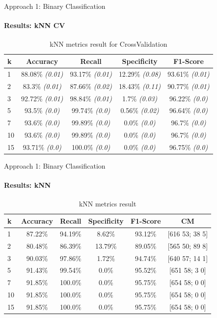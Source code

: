 \documentclass[9pt, pstricks, xcolor=dvipsnames]{beamer}
\begin{document}
\begin{frame}{Approach 1: Binary Classification}
	\framesubtitle{Results: kNN CV}
	\begin{table}[H]
		\centering
		\begin{tabular}{lcccc}
			\toprule
			k  & Accuracy                & Recall                  & Specificity             & F1-Score                \\
			\midrule
			1  & 88.08\% \textit{(0.01)} & 93.17\% \textit{(0.01)} & 12.29\% \textit{(0.08)} & 93.61\% \textit{(0.01)} \\
			2  & 83.3\% \textit{(0.01)}  & 87.66\% \textit{(0.02)} & 18.43\% \textit{(0.11)} & 90.77\% \textit{(0.01)} \\
			3  & 92.72\% \textit{(0.01)} & 98.84\% \textit{(0.01)} & 1.7\% \textit{(0.03)}   & 96.22\% \textit{(0.0)}  \\
			5  & 93.5\% \textit{(0.0)}   & 99.74\% \textit{(0.0)}  & 0.56\% \textit{(0.02)}  & 96.64\% \textit{(0.0)}  \\
			7  & 93.6\% \textit{(0.0)}   & 99.89\% \textit{(0.0)}  & 0.0\% \textit{(0.0)}    & 96.7\% \textit{(0.0)}   \\
			10 & 93.6\% \textit{(0.0)}   & 99.89\% \textit{(0.0)}  & 0.0\% \textit{(0.0)}    & 96.7\% \textit{(0.0)}   \\
			15 & 93.71\% \textit{(0.0)}  & 100.0\% \textit{(0.0)}  & 0.0\% \textit{(0.0)}    & 96.75\% \textit{(0.0)}  \\

			\bottomrule
		\end{tabular}
		\caption{kNN metrics result for CrossValidation}
		\label{tab:kNN_CV_approach1}
	\end{table}
\end{frame}
\begin{frame}{Approach 1: Binary Classification}
	\framesubtitle{Results: kNN}
	\begin{table}[H]
		\centering
		\begin{tabular}{lccccc}
			\toprule
			k  & Accuracy & Recall  & Specificity & F1-Score & CM             \\
			\midrule
			1  & 87.22\%  & 94.19\% & 8.62\%      & 93.12\%  & [616 53; 38 5] \\
			2  & 80.48\%  & 86.39\% & 13.79\%     & 89.05\%  & [565 50; 89 8] \\
			3  & 90.03\%  & 97.86\% & 1.72\%      & 94.74\%  & [640 57; 14 1] \\
			5  & 91.43\%  & 99.54\% & 0.0\%       & 95.52\%  & [651 58; 3 0]  \\
			7  & 91.85\%  & 100.0\% & 0.0\%       & 95.75\%  & [654 58; 0 0]  \\
			10 & 91.85\%  & 100.0\% & 0.0\%       & 95.75\%  & [654 58; 0 0]  \\
			15 & 91.85\%  & 100.0\% & 0.0\%       & 95.75\%  & [654 58; 0 0]  \\
			\bottomrule
		\end{tabular}
		\caption{kNN metrics result}
		\label{tab:kNN_approach1}
	\end{table}
\end{frame}
\end{document}
